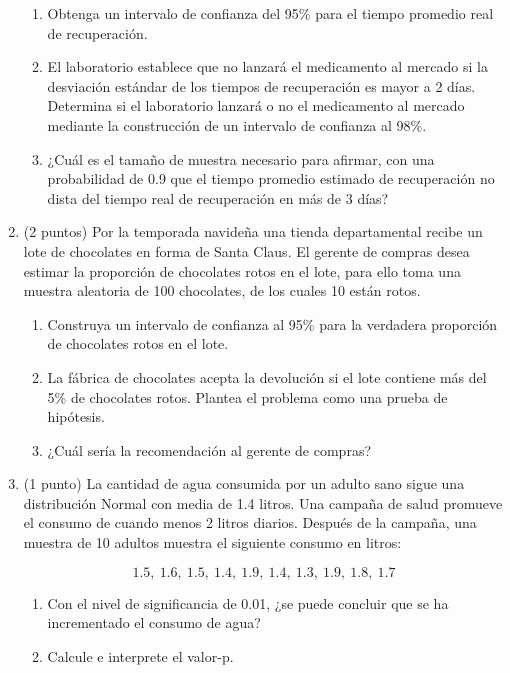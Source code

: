 \documentclass[12pt]{article}
\begin{document}
\begin{enumerate}
	      \begin{enumerate}
		      \item Obtenga un intervalo de confianza del 95\% para el tiempo promedio real de
		            recuperación.
		      \item El laboratorio establece que no lanzará el medicamento al mercado si la
		            desviación estándar de los tiempos de recuperación es mayor a 2 días. Determina
		            si el laboratorio lanzará o no el medicamento al mercado mediante la
		            construcción de un intervalo de confianza al 98\%.
		      \item ¿Cuál es el tamaño de muestra necesario para afirmar, con una probabilidad de 0.9 que el tiempo promedio estimado de recuperación no dista del tiempo real de recuperación en más de 3 días?
	      \end{enumerate}

	\item (2 puntos) Por la temporada navideña una tienda departamental recibe un lote de chocolates en forma de Santa Claus. El gerente de compras desea estimar la proporción de chocolates rotos en el lote, para ello toma una muestra aleatoria de 100 chocolates, de los cuales 10 están rotos.

	      \begin{enumerate}
		      \item Construya un intervalo de confianza al 95\% para la verdadera proporción de
		            chocolates rotos en el lote.
		      \item La fábrica de chocolates acepta la devolución si el lote contiene más del 5\%
		            de chocolates rotos. Plantea el problema como una prueba de hipótesis.
		      \item ¿Cuál sería la recomendación al gerente de compras?
	      \end{enumerate}

	\item (1 punto) La cantidad de agua consumida por un adulto sano sigue una distribución Normal con media de 1.4 litros. Una campaña de salud promueve el consumo de cuando menos 2 litros diarios. Después de la campaña, una muestra de 10 adultos muestra el siguiente consumo en litros:

	      \[
		      1.5,\ 1.6,\ 1.5,\ 1.4,\ 1.9,\ 1.4,\ 1.3,\ 1.9,\ 1.8,\ 1.7
	      \]

	      \begin{enumerate}
		      \item Con el nivel de significancia de 0.01, ¿se puede concluir que se ha
		            incrementado el consumo de agua?
		      \item Calcule e interprete el valor-p.
	      \end{enumerate}
\end{enumerate}
\end{document}
